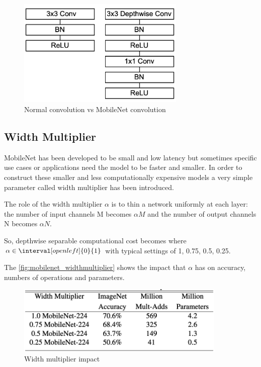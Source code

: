 \begin{figure}[ht]
    \includegraphics[width=8cm]{images/experiments/mobilenet_convolution.png}
    \centering
    \caption{Normal convolution vs MobileNet convolution}\label{fig:mobilenet_convolution}
\end{figure}

\subsection{Width Multiplier}
MobileNet has been developed to be small and low latency but sometimes specific
use cases or applications need the model to be faster and smaller.
In order to construct these smaller and less computationally expensive models
a very simple parameter \bm{$\alpha$} called width multiplier has been
introduced.

The role of the width multiplier $\alpha$ is to thin a network uniformly at
each layer: the number of input channels M becomes $\alpha M$ and the number of
output channels N becomes $\alpha N$.

So, depthwise separable computational cost becomes  where $\alpha \in \interval[open left]{0}{1}$ with typical settings of 1,
0.75, 0.5, 0.25.

The \autoref{fig:mobilenet_widthmultiplier} shows the impact that $\alpha$ has
on accuracy, numbers of operations and parameters.

\begin{figure}[ht]
    \includegraphics[width=10cm]{images/experiments/mobilenet_widthmultiplier.png}
    \centering
    \caption{Width multiplier impact}\label{fig:mobilenet_widthmultiplier}
\end{figure}

